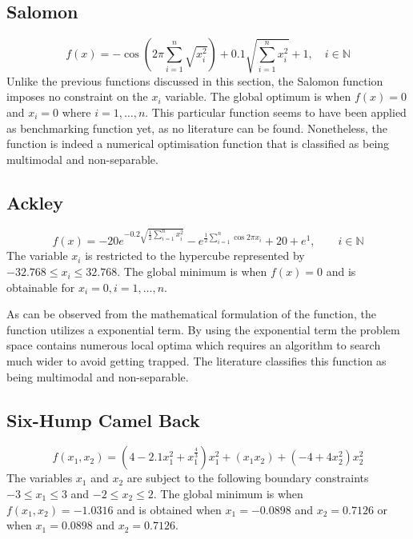 \subsection{Salomon}
\begin{equation}
	f(x) = -\cos{(2\pi\sum_{i=1}^n\sqrt{x_i^2})} + 0.1 \sqrt{\sum_{i=1}^n x_i^2} + 1, \quad i \in \mathbb{N}
\end{equation}
Unlike the previous functions discussed in this section, the Salomon function imposes no constraint on the $x_i$ variable. The global optimum is when $f(x) = 0$ and $x_i = 0$ where $i = 1,\ldots,n$. This particular function seems to have been applied as benchmarking function yet, as no literature can be found. Nonetheless, the function is indeed a numerical optimisation function that is classified as being multimodal and non-separable\cite{http://www.it.lut.fi/ip/evo/functions/node12.html}.
\subsection{Ackley}
\begin{equation}
	f(x) = -20e^{-0.2\sqrt{\frac{1}{2}\sum_{i=1}^n x_i^2}} - e^{\frac{1}{2}\sum_{i=1}^n\cos{2\pi x_i}} + 20 + e^1, \qquad i \in \mathbb{N}
\end{equation}
The variable $x_i$ is restricted to the hypercube represented by $-32.768 \leq x_i \leq 32.768$\cite{numericalABC,ABCCompareStudy,ARPSO,TestFunctions}. The global minimum is when $f(x) = 0$ and is obtainable for $x_i = 0, i = 1,\ldots,n$\cite{numericalABC,ABCCompareStudy,ARPSO,TestFunctions}.

As can be observed from the mathematical formulation of the function, the function utilizes a exponential term. By using the exponential term the problem space contains numerous local optima which requires an algorithm to search much wider to avoid getting trapped. The literature classifies this function as being multimodal and non-separable\cite{adaptPSO,ABCCompareStudy,numericalABC,TestFunctions}.
\subsection{Six-Hump Camel Back}
\begin{equation}
	f(x_1,x_2) = (4 - 2.1x_1^2 + x_1^{\frac{4}{3}})x_1^2 + (x_1x_2) + (-4 + 4x_2^2)x_2^2
\end{equation}
The variables $x_1$ and $x_2$ are subject to the following boundary constraints $-3 \leq x_1 \leq 3$ and $-2 \leq x_2 \leq 2$\cite{DistributedHierarchicalGA,TestFunctions}. The global minimum is when $f(x_1,x_2) = -1.0316$ and is obtained when $x_1 = -0.0898$ and $x_2 = 0.7126$ or when  $x_1 = 0.0898$ and $x_2 = 0.7126$\cite{DistributedHierarchicalGA,TestFunctions}. 

